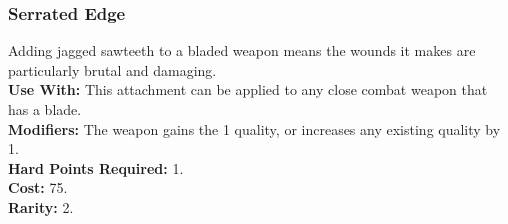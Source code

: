 \subsubsection{Serrated Edge}
Adding jagged sawteeth to a bladed weapon means the
wounds it makes are particularly brutal and damaging.\\
\textbf{Use With:} This attachment can be applied to any close
    combat weapon that has a blade.\\
\textbf{Modifiers:} The weapon gains the  1 quality, or
    increases any existing  quality by 1.\\
\textbf{Hard Points Required:} 1.\\
\textbf{Cost:} 75.\\
\textbf{Rarity:} 2.\\
